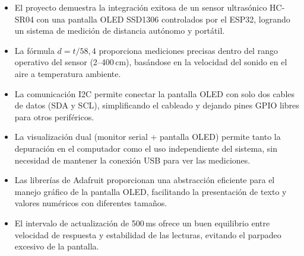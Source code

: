\documentclass[12pt,a4paper]{article}
\begin{document}
\begin{itemize}
    \item El proyecto demuestra la integración exitosa de un sensor ultrasónico HC-SR04 con una pantalla OLED SSD1306 controlados por el ESP32, logrando un sistema de medición de distancia autónomo y portátil.
    \item La fórmula $d = t/58{,}4$ proporciona mediciones precisas dentro del rango operativo del sensor (2--400\,cm), basándose en la velocidad del sonido en el aire a temperatura ambiente.
    \item La comunicación I2C permite conectar la pantalla OLED con solo dos cables de datos (SDA y SCL), simplificando el cableado y dejando pines GPIO libres para otros periféricos.
    \item La visualización dual (monitor serial + pantalla OLED) permite tanto la depuración en el computador como el uso independiente del sistema, sin necesidad de mantener la conexión USB para ver las mediciones.
    \item Las librerías de Adafruit proporcionan una abstracción eficiente para el manejo gráfico de la pantalla OLED, facilitando la presentación de texto y valores numéricos con diferentes tamaños.
    \item El intervalo de actualización de 500\,ms ofrece un buen equilibrio entre velocidad de respuesta y estabilidad de las lecturas, evitando el parpadeo excesivo de la pantalla.
\end{itemize}
\end{document}
